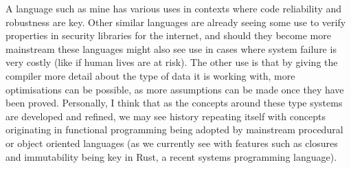A language such as mine has various uses in contexts where code reliability and robustness are key.
Other similar languages are already seeing some use to verify properties in security libraries for
the internet, and should they become more mainstream these languages might also see use in cases
where system failure is very costly (like if human lives are at risk).
The other use is that by giving the compiler more detail about the type of data it is working with,
more optimisations can be possible, as more assumptions can be made once they have been proved.
Personally, I think that as the concepts around these type systems are developed and refined,
we may see history repeating itself with concepts originating in functional programming being
adopted by mainstream procedural or object oriented languages (as we currently see with features
such as closures and immutability being key in Rust, a recent systems programming language).
